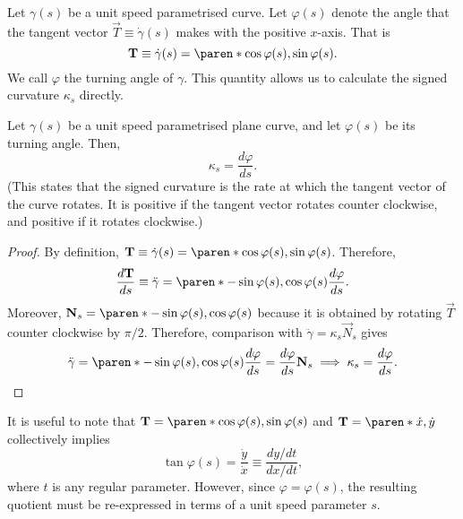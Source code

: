 \documentclass[11pt]{penrose}
\newcommand{\vT}{\vec{T}}
\newcommand{\vN}{\vec{N}}
\begin{document}
Let $\gamma(s)$ be a unit speed parametrised curve. Let $\varphi(s)$ denote the angle that the tangent vector $\vT \equiv \dot{\gamma}(s)$ makes with the positive $x$-axis. That is
\begin{equation}
    \vT \equiv \dot{\gamma}(s) = \paren*{\cos\varphi(s), \sin\varphi(s)}.
\end{equation}
We call $\varphi$ the turning angle of $\gamma$. This quantity allows us to calculate the signed curvature $\kappa_s$ directly.

\begin{nprop}
    Let $\gamma(s)$ be a unit speed parametrised plane curve, and let $\varphi(s)$ be its turning angle. Then,
    \begin{equation*}
        \kappa_s = \frac{d\varphi}{ds}.
    \end{equation*}
    (This states that the signed curvature is the rate at which the tangent vector of the curve rotates. It is positive if the tangent vector rotates counter clockwise, and positive if it rotates clockwise.)
\end{nprop}
\begin{proof}
    By definition, $\vT \equiv \dot{\gamma}(s) = \paren*{\cos\varphi(s), \sin\varphi(s)}$. Therefore,
    \begin{equation}
        \frac{d\vT}{ds} \equiv \ddot{\gamma} = \paren*{-\sin\varphi(s), \cos\varphi(s)} \frac{d\varphi}{ds}.
    \end{equation}
    Moreover, $\vN_s = \paren*{-\sin\varphi(s), \cos\varphi(s)}$ because it is obtained by rotating $\vT$ counter clockwise by $\pi/2$. Therefore, comparison with $\ddot{\gamma} = \kappa_s \vN_s$ gives
    \begin{equation}
        \ddot{\gamma} = \paren*{-\sin\varphi(s), \cos\varphi(s)} \frac{d\varphi}{ds} = \frac{d\varphi}{ds} \vN_s
        \implies
        \kappa_s = \frac{d\varphi}{ds}.
    \end{equation}
\end{proof}

It is useful to note that $\vT = \paren*{\cos\varphi(s), \sin\varphi(s)}$ and $\vT = \paren*{\dot{x}, \dot{y}}$ collectively implies
\begin{equation}
    \tan\varphi(s) = \frac{\dot{y}}{\dot{x}} \equiv \frac{dy/dt}{dx/dt},
\end{equation}
where $t$ is any regular parameter. However, since $\varphi = \varphi(s)$, the resulting quotient must be re-expressed in terms of a unit speed parameter $s$.
\end{document}
